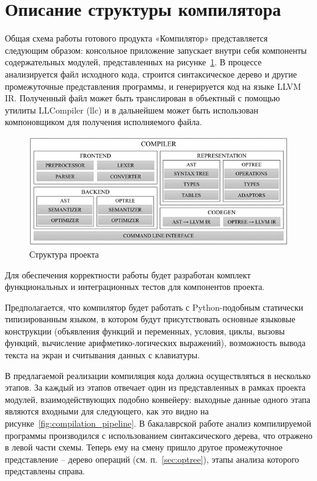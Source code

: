 \newpage
\section{Описание структуры компилятора}
\label{sec:project_structure}

Общая схема работы готового продукта «Компилятор» представляется следующим образом: консольное приложение запускает внутри себя компоненты содержательных модулей, представленных на рисунке~\ref{fig:project_structure}.
В процессе анализируется файл исходного кода, строится синтаксическое дерево и другие промежуточные представления программы, и генерируется код на языке LLVM IR.
Полученный файл может быть транслирован в объектный с помощью утилиты LLCompiler (llc) и в дальнейшем может быть использован компоновщиком для получения исполняемого файла.

\begin{figure}[h]
    \centering
    \includegraphics[width=\textwidth]{images/project-structure.png}
    \caption{Структура проекта}
    \label{fig:project_structure}
\end{figure}

Для обеспечения корректности работы будет разработан комплект функциональных и интеграционных тестов для компонентов проекта.

Предполагается, что компилятор будет работать с Python-подобным статически типизированным языком, в котором будут присутствовать основные языковые конструкции (объявления функций и переменных, условия, циклы, вызовы функций, вычисление арифметико-логических выражений), возможность вывода текста на экран и считывания данных с клавиатуры.

В предлагаемой реализации компиляция кода должна осуществляться в несколько этапов.
За каждый из этапов отвечает один из представленных в рамках проекта модулей, взаимодействующих подобно конвейеру: выходные данные одного этапа являются входными для следующего, как это видно на рисунке~\ref{fig:compilation_pipeline}.
В бакалаврской работе анализ компилируемой программы производился с использованием синтаксического дерева, что отражено в левой части схемы.
Теперь ему на смену пришло другое промежуточное представление -- дерево операций (см. п.~\ref{sec:optree}), этапы анализа которого представлены справа.

